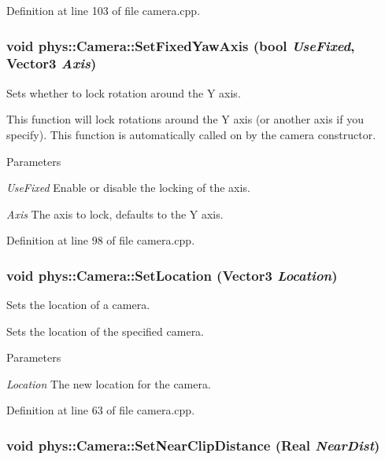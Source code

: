 Definition at line 103 of file camera.cpp.

\hypertarget{classphys_1_1Camera_a0fe097fbabbe1a88881f25bc827cabf5}{
\subsubsection[{SetFixedYawAxis}]{\setlength{\rightskip}{0pt plus 5cm}void phys::Camera::SetFixedYawAxis (bool {\em UseFixed}, \/  {\bf Vector3} {\em Axis})}}
\label{d9/df8/classphys_1_1Camera_a0fe097fbabbe1a88881f25bc827cabf5}


Sets whether to lock rotation around the Y axis. 

This function will lock rotations around the Y axis (or another axis if you specify). This function is automatically called on by the camera constructor. 
\begin{DoxyParams}{Parameters}
\item[{\em UseFixed}]Enable or disable the locking of the axis. \item[{\em Axis}]The axis to lock, defaults to the Y axis. \end{DoxyParams}


Definition at line 98 of file camera.cpp.

\hypertarget{classphys_1_1Camera_ab1fb572982464212b2fa33e2df6f688b}{
\subsubsection[{SetLocation}]{\setlength{\rightskip}{0pt plus 5cm}void phys::Camera::SetLocation ({\bf Vector3} {\em Location})}}
\label{d9/df8/classphys_1_1Camera_ab1fb572982464212b2fa33e2df6f688b}


Sets the location of a camera. 

Sets the location of the specified camera. 
\begin{DoxyParams}{Parameters}
\item[{\em Location}]The new location for the camera. \end{DoxyParams}


Definition at line 63 of file camera.cpp.

\hypertarget{classphys_1_1Camera_aff7cb792640b250cafdfbc333de4bbeb}{
\subsubsection[{SetNearClipDistance}]{\setlength{\rightskip}{0pt plus 5cm}void phys::Camera::SetNearClipDistance ({\bf Real} {\em NearDist})}}
\label{d9/df8/classphys_1_1Camera_aff7cb792640b250cafdfbc333de4bbeb}


